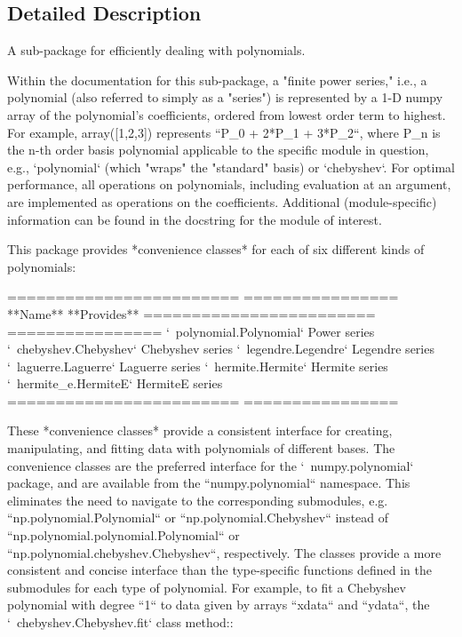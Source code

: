 \subsection{Detailed Description}
\begin{DoxyVerb}A sub-package for efficiently dealing with polynomials.

Within the documentation for this sub-package, a "finite power series,"
i.e., a polynomial (also referred to simply as a "series") is represented
by a 1-D numpy array of the polynomial's coefficients, ordered from lowest
order term to highest.  For example, array([1,2,3]) represents
``P_0 + 2*P_1 + 3*P_2``, where P_n is the n-th order basis polynomial
applicable to the specific module in question, e.g., `polynomial` (which
"wraps" the "standard" basis) or `chebyshev`.  For optimal performance,
all operations on polynomials, including evaluation at an argument, are
implemented as operations on the coefficients.  Additional (module-specific)
information can be found in the docstring for the module of interest.

This package provides *convenience classes* for each of six different kinds
of polynomials:

 ========================    ================
 **Name**                    **Provides**
 ========================    ================
 `~polynomial.Polynomial`    Power series
 `~chebyshev.Chebyshev`      Chebyshev series
 `~legendre.Legendre`        Legendre series
 `~laguerre.Laguerre`        Laguerre series
 `~hermite.Hermite`          Hermite series
 `~hermite_e.HermiteE`       HermiteE series
 ========================    ================

These *convenience classes* provide a consistent interface for creating,
manipulating, and fitting data with polynomials of different bases.
The convenience classes are the preferred interface for the `~numpy.polynomial`
package, and are available from the ``numpy.polynomial`` namespace.
This eliminates the need to navigate to the corresponding submodules, e.g.
``np.polynomial.Polynomial`` or ``np.polynomial.Chebyshev`` instead of
``np.polynomial.polynomial.Polynomial`` or
``np.polynomial.chebyshev.Chebyshev``, respectively.
The classes provide a more consistent and concise interface than the
type-specific functions defined in the submodules for each type of polynomial.
For example, to fit a Chebyshev polynomial with degree ``1`` to data given
by arrays ``xdata`` and ``ydata``, the
`~chebyshev.Chebyshev.fit` class method::


\end{DoxyVerb}

